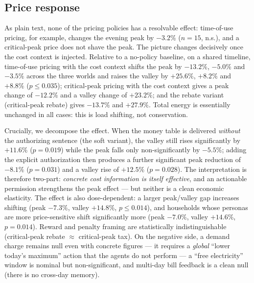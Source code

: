 \documentclass[11pt]{article}
\begin{document}
\subsection{Price response}
\label{sec:price}
As plain text, none of the pricing policies has a resolvable effect: time-of-use pricing, for example,
changes the evening peak by $-3.2\%$ ($n=15$, n.s.), and a critical-peak price does not shave the peak.
The picture changes decisively once the cost context is injected. Relative to a no-policy baseline, on a
shared timeline, time-of-use pricing with the cost context shifts the peak by $-13.2\%$, $-5.0\%$ and
$-3.5\%$ across the three worlds and raises the valley by $+25.6\%$, $+8.2\%$ and $+8.8\%$
($p\le0.035$); critical-peak pricing with the cost context gives a peak change of $-12.2\%$ and a valley
change of $+23.2\%$; and the rebate variant (critical-peak rebate) gives $-13.7\%$ and $+27.9\%$. Total
energy is essentially unchanged in all cases: this is load shifting, not conservation.

Crucially, we decompose the effect. When the money table is delivered \emph{without} the authorizing
sentence (the soft variant), the valley still rises significantly by $+11.6\%$ ($p=0.019$) while the peak
falls only non-significantly by $-5.5\%$; adding the explicit authorization then produces a further
significant peak reduction of $-8.1\%$ ($p=0.031$) and a valley rise of $+12.5\%$ ($p=0.028$). The
interpretation is therefore two-part: \emph{concrete cost information is itself effective}, and an
actionable permission strengthens the peak effect --- but neither is a clean economic elasticity. The
effect is also dose-dependent: a larger peak/valley gap increases shifting (peak $-7.3\%$, valley
$+14.8\%$, $p\le0.014$), and households whose personas are more price-sensitive shift significantly more
(peak $-7.0\%$, valley $+14.6\%$, $p=0.014$). Reward and penalty framing are statistically
indistinguishable (critical-peak rebate $\approx$ critical-peak tax). On the negative side, a demand charge
remains null even with concrete figures --- it requires a \emph{global} ``lower today's maximum'' action
that the agents do not perform --- a ``free electricity'' window is nominal but non-significant, and
multi-day bill feedback is a clean null (there is no cross-day memory).
\end{document}
